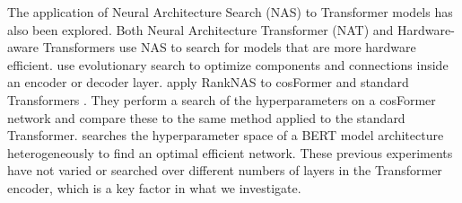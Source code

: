 The application of Neural Architecture Search (NAS) to Transformer models has also been explored.
Both Neural Architecture Transformer (NAT) \cite{guo2019nat} and Hardware-aware Transformers \cite{wang2020hat} use NAS to search for models that are more hardware efficient. 
\citet{so2019evolved} use evolutionary search to optimize components and connections inside an encoder or decoder layer.
\citet{tfm_nas_efficient} apply RankNAS \citep{rank_nas} to cosFormer \citep{cosformer} and standard Transformers \citep{tfm}.
They perform a search of the hyperparameters on a cosFormer network and compare these to the same method applied to the standard Transformer.
\citet{tfm_nas_one_shot} searches the hyperparameter space of a BERT \citep{bert} model architecture heterogeneously to find an optimal efficient network.
These previous experiments have not varied or searched over different numbers of layers in the Transformer encoder, which is a key factor in what we investigate.

